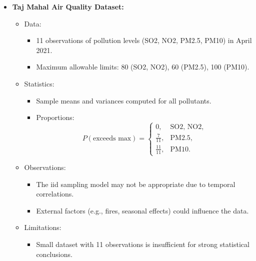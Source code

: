 \documentclass{article}
\begin{document}
\begin{itemize}
  \item \textbf{Taj Mahal Air Quality Dataset:}
    \begin{itemize}
      \item Data:
        \begin{itemize}
          \item 11 observations of pollution levels (SO2, NO2, PM2.5, PM10) in April 2021.
          \item Maximum allowable limits: 80 (SO2, NO2), 60 (PM2.5), 100 (PM10).
        \end{itemize}
      \item Statistics:
        \begin{itemize}
          \item Sample means and variances computed for all pollutants.
          \item Proportions:
            \[
              P(\text{exceeds max}) =
              \begin{cases}
                0, & \text{SO2, NO2}, \\
                \frac{7}{11}, & \text{PM2.5}, \\
                \frac{11}{11}, & \text{PM10}.
              \end{cases}
            \]
        \end{itemize}
      \item Observations:
        \begin{itemize}
          \item The iid sampling model may not be appropriate due to temporal correlations.
          \item External factors (e.g., fires, seasonal effects) could influence the data.
        \end{itemize}
      \item Limitations:
        \begin{itemize}
          \item Small dataset with 11 observations is insufficient for strong statistical conclusions.
        \end{itemize}
    \end{itemize}


\end{itemize}
\end{document}

